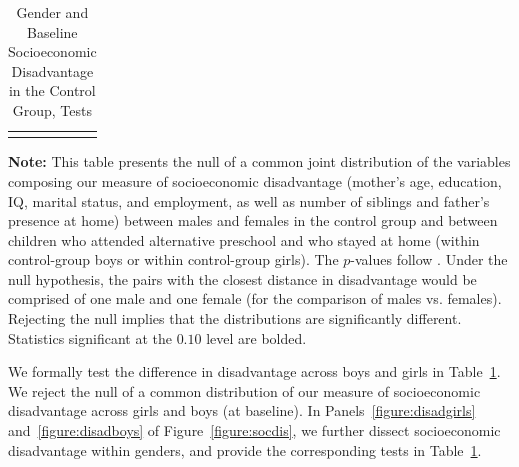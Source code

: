 \begin{table}[!htpb]
\begin{threeparttable}
\caption{Gender and Baseline Socioeconomic Disadvantage in the Control Group, Tests} \label{table:disadtests}
\centering
\begin{tabularx}{16.5cm}{XcX}
&  &
\end{tabularx}
\begin{tablenotes}
\footnotesize
\item \textbf{Note:} This table presents the null of a common joint distribution of the variables composing our measure of socioeconomic disadvantage (mother's age, education, IQ, marital status, and employment, as well as number of siblings and father's presence at home) between males and females in the control group and between children who attended  alternative preschool and who stayed at home (within control-group boys or within control-group girls). The $p$-values follow \citet{Rosenbaum_2005_Distribution_JRSS}. Under the null hypothesis, the pairs with the closest distance in disadvantage would be comprised of one male and one female (for the comparison of males vs. females). Rejecting the null implies that the distributions are significantly different. Statistics significant at the $0.10$ level are bolded.
\end{tablenotes}
\end{threeparttable}
\end{table}

We formally test the difference in disadvantage across boys and girls in Table~\ref{table:disadtests}. We reject the null of a common distribution of our measure of socioeconomic disadvantage across girls and boys (at baseline). In Panels~\ref{figure:disadgirls} and~\ref{figure:disadboys} of Figure~\ref{figure:socdis}, we further dissect socioeconomic disadvantage within genders, and provide the corresponding tests in Table~\ref{table:disadtests}.


